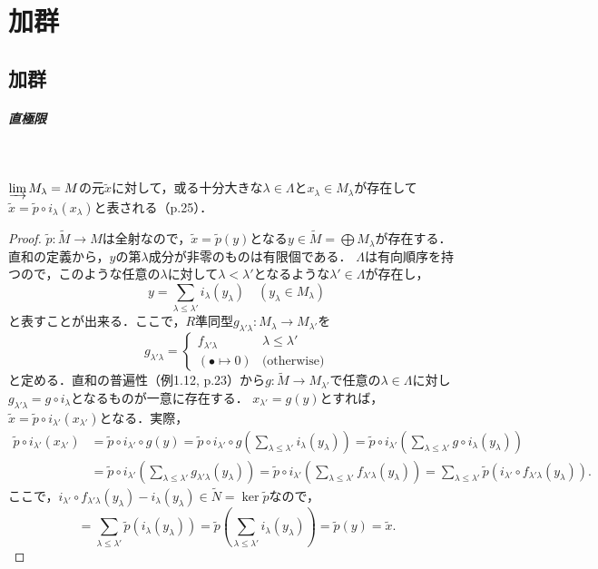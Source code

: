 \chapter{加群}
\section{加群}
\paragraph{直極限}~
\begin{screen}
  $\varinjlim M_\lambda=M$の元$\tilde{x}$に対して，或る十分大きな$\lambda\in\Lambda$と$x_\lambda\in M_\lambda$が存在して$\tilde{x} = \tilde{p} \circ i_\lambda (x_\lambda)$と表される（p.25）．
\end{screen}
\begin{proof}
  $\tilde{p}\colon \tilde{M} \to M$は全射なので，$\tilde{x} = \tilde{p}(y)$となる$y \in \tilde{M} = \bigoplus M_\lambda$が存在する．
  直和の定義から，$y$の第$\lambda$成分が非零のものは有限個である．
  $\Lambda$は有向順序を持つので，このような任意の$\lambda$に対して$\lambda < \lambda'$となるような$\lambda' \in \Lambda$が存在し，
  \[y = \sum_{\lambda \leq \lambda'} i_\lambda (y_\lambda) \quad (y_\lambda \in M_\lambda)\]
  と表すことが出来る．ここで，$R$準同型$g_{\lambda'\lambda}\colon M_\lambda \to M_{\lambda'}$を
  \[g_{\lambda'\lambda}=
  \begin{cases}
    f_{\lambda'\lambda} & \lambda \leq \lambda' \\
    (\bullet \mapsto 0) & \text{(otherwise)}
  \end{cases}
  \]
  と定める．直和の普遍性（例1.12, p.23）から$g\colon \tilde{M} \to M_{\lambda'}$で任意の$\lambda \in \Lambda$に対し$g_{\lambda'\lambda} = g \circ i_\lambda$となるものが一意に存在する．
  $x_{\lambda'} = g(y)$とすれば，$\tilde{x} = \tilde{p} \circ i_{\lambda'} (x_{\lambda'})$となる．実際，
  \begin{align*}
    \tilde{p} \circ i_{\lambda'} (x_{\lambda'})
    &= \tilde{p} \circ i_{\lambda'} \circ g (y) = \tilde{p} \circ i_{\lambda'} \circ g \left( \sum_{\lambda \leq \lambda'} i_\lambda (y_\lambda) \right)
    = \tilde{p} \circ i_{\lambda'} \left( \sum_{\lambda \leq \lambda'} g \circ i_\lambda (y_\lambda) \right) \\
    & = \tilde{p} \circ i_{\lambda'} \left( \sum_{\lambda \leq \lambda'} g_{\lambda'\lambda} (y_\lambda) \right)
    = \tilde{p} \circ i_{\lambda'} \left( \sum_{\lambda \leq \lambda'} f_{\lambda'\lambda} (y_\lambda) \right)
    = \sum_{\lambda \leq \lambda'} \tilde{p} ( i_{\lambda'} \circ f_{\lambda'\lambda} (y_\lambda) ).
  \end{align*}
  ここで，$i_{\lambda'} \circ f_{\lambda'\lambda} (y_\lambda) - i_\lambda (y_\lambda) \in \tilde{N} = \ker\tilde{p}$なので，
  \[= \sum_{\lambda \leq \lambda'} \tilde{p} ( i_{\lambda} (y_\lambda) ) = \tilde{p} \left( \sum_{\lambda \leq \lambda'} i_{\lambda} (y_\lambda)\right) = \tilde{p}(y) = \tilde{x}.\]
\end{proof}

